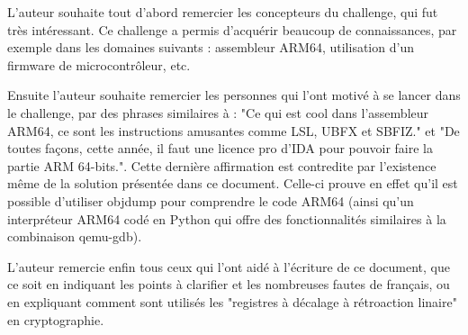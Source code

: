 \documentclass[a4paper,10pt]{article}
\begin{document}
L'auteur souhaite tout d'abord remercier les concepteurs du challenge, qui fut très intéressant. Ce challenge a permis d'acquérir beaucoup de connaissances, par exemple dans les domaines suivants : assembleur ARM64, utilisation d'un firmware de microcontrôleur, etc.

Ensuite l'auteur souhaite remercier les personnes qui l'ont motivé à se lancer dans le challenge, par des phrases similaires à : "Ce qui est cool dans l'assembleur ARM64, ce sont les instructions amusantes comme LSL, UBFX et SBFIZ." et "De toutes façons, cette année, il faut une licence pro d'IDA pour pouvoir faire la partie ARM 64-bits.". Cette dernière affirmation est contredite par l'existence même de la solution présentée dans ce document. Celle-ci prouve en effet qu'il est possible d'utiliser objdump pour comprendre le code ARM64 (ainsi qu'un interpréteur ARM64 codé en Python qui offre des fonctionnalités similaires à la combinaison qemu-gdb).

L'auteur remercie enfin tous ceux qui l'ont aidé à l'écriture de ce document, que ce soit en indiquant les points à clarifier et les nombreuses fautes de français, ou en expliquant comment sont utilisés les "registres à décalage à rétroaction linaire" en cryptographie.

\clearpage
\end{document}
